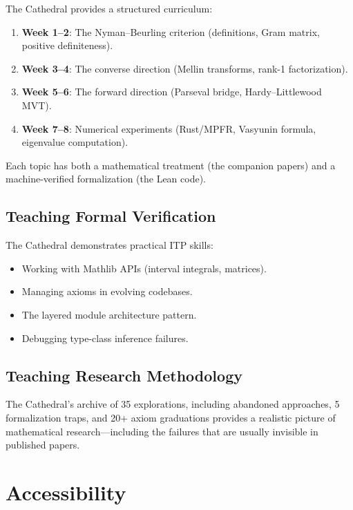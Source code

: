 \documentclass[11pt,a4paper]{article}
\begin{document}
The Cathedral provides a structured curriculum:
\begin{enumerate}
  \item \textbf{Week 1--2}: The Nyman--Beurling criterion
    (definitions, Gram matrix, positive definiteness).
  \item \textbf{Week 3--4}: The converse direction
    (Mellin transforms, rank-1 factorization).
  \item \textbf{Week 5--6}: The forward direction
    (Parseval bridge, Hardy--Littlewood MVT).
  \item \textbf{Week 7--8}: Numerical experiments
    (Rust/MPFR, Vasyunin formula, eigenvalue computation).
\end{enumerate}

Each topic has both a mathematical treatment (the companion papers)
and a machine-verified formalization (the Lean code).

\subsection{Teaching Formal Verification}

The Cathedral demonstrates practical ITP skills:
\begin{itemize}
  \item Working with Mathlib APIs (interval integrals, matrices).
  \item Managing axioms in evolving codebases.
  \item The layered module architecture pattern.
  \item Debugging type-class inference failures.
\end{itemize}

\subsection{Teaching Research Methodology}

The Cathedral's archive of 35 explorations, including abandoned approaches,
5 formalization traps, and 20+ axiom graduations provides a realistic
picture of mathematical research---including the failures that are
usually invisible in published papers.

\section{Accessibility}
\end{document}

